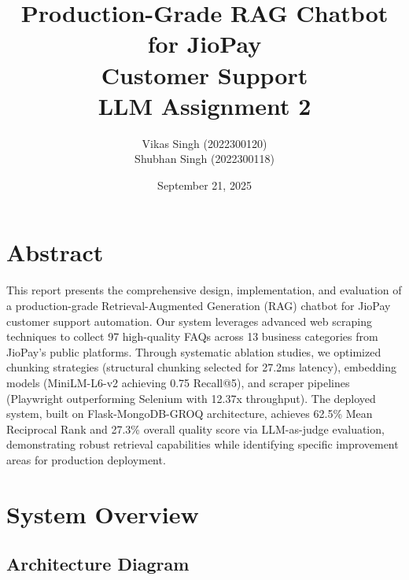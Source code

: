\documentclass[11pt,a4paper]{article}
\title{\textbf{Production-Grade RAG Chatbot for JioPay\\Customer Support}\\
\vspace{0.5cm}
\large LLM Assignment 2}
\author{Vikas Singh (2022300120)\\Shubhan Singh (2022300118)}
\date{September 21, 2025}
\begin{document}
\maketitle
\thispagestyle{empty}

\newpage

\tableofcontents

\newpage

\section{Abstract}

This report presents the comprehensive design, implementation, and evaluation of a production-grade Retrieval-Augmented Generation (RAG) chatbot for JioPay customer support automation. Our system leverages advanced web scraping techniques to collect 97 high-quality FAQs across 13 business categories from JioPay's public platforms. Through systematic ablation studies, we optimized chunking strategies (structural chunking selected for 27.2ms latency), embedding models (MiniLM-L6-v2 achieving 0.75 Recall@5), and scraper pipelines (Playwright outperforming Selenium with 12.37x throughput). The deployed system, built on Flask-MongoDB-GROQ architecture, achieves 62.5\% Mean Reciprocal Rank and 27.3\% overall quality score via LLM-as-judge evaluation, demonstrating robust retrieval capabilities while identifying specific improvement areas for production deployment.

\section{System Overview}

\subsection{Architecture Diagram}
\end{document}
